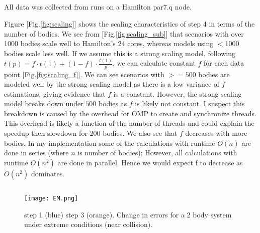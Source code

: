 \subsection{}
All data was collected from runs on a Hamilton par7.q node.

Figure [Fig.\ref{fig:scaling}] shows the scaling characteristics of step 4 in terms of the number of bodies. 
We see from [Fig.\ref{fig:scaling_sub}] that scenarios with over 1000 bodies scale well to Hamilton's 24 cores, whereas models using $<$1000 bodies scale less well. 
If we assume this is a strong scaling model, following $t(p) = f \cdot t(1) + (1-f)\cdot \frac{t(1)}{p}$, we can calculate constant $f$ for each data point [Fig.\ref{fig:scaling_f}]. We can see scenarios with $>=500$ bodies are modeled well by the strong scaling model as there is a low variance of $f$ estimations, giving evidence that $f$ is a constant. 
However, the strong scaling model breaks down under $500$ bodies as $f$ is likely not constant. 
I suspect this breakdown is caused by the overhead for OMP to create and synchronize threads. 
This overhead is likely a function of the number of threads and could explain the speedup then slowdown for $200$ bodies.
We also see that $f$ decreases with more bodies. In my implementation some of the calculations with runtime $O(n)$ are done in series (where $n$ is number of bodies); However, all calculations with runtime $O(n^2)$ are done in parallel. Hence we would expect f to decrease as $O(n^2)$ dominates.

\subsection{}

\begin{figure}[h!]
    \begin{center}
    \texttt{[image: EM.png]}
      \caption{step 1 (blue) step 3 (orange). Change in errors for a 2 body system under extreme conditions (near collision).}
      \label{fig:convergence}
    \end{center}
    \end{figure}
